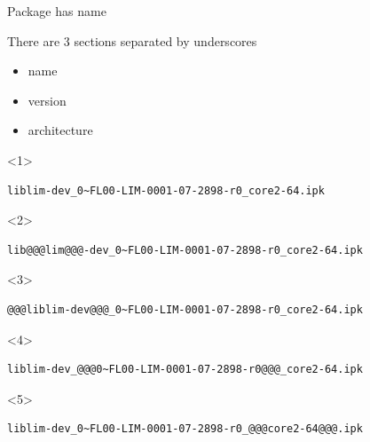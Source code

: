 \documentclass{beamer}
\begin{document}
\begin{frame}[fragile]{Package has name}
    \begin{block}{}
        There are 3 sections separated by underscores
        \begin{itemize}
            \item<2->{name }
            \item<4->{version}
            \item<5->{architecture}
        \end{itemize}
    \end{block}
\begin{onlyenv}<1>\begin{lstlisting}[style=Console]
liblim-dev_0~FL00-LIM-0001-07-2898-r0_core2-64.ipk
\end{lstlisting}\end{onlyenv}
\begin{onlyenv}<2>\begin{lstlisting}[style=Console]
lib@@@lim@@@-dev_0~FL00-LIM-0001-07-2898-r0_core2-64.ipk
\end{lstlisting}\end{onlyenv}
\begin{onlyenv}<3>\begin{lstlisting}[style=Console]
@@@liblim-dev@@@_0~FL00-LIM-0001-07-2898-r0_core2-64.ipk
\end{lstlisting}\end{onlyenv}
\begin{onlyenv}<4>\begin{lstlisting}[style=Console]
liblim-dev_@@@0~FL00-LIM-0001-07-2898-r0@@@_core2-64.ipk
\end{lstlisting}\end{onlyenv}
\begin{onlyenv}<5>\begin{lstlisting}[style=Console]
liblim-dev_0~FL00-LIM-0001-07-2898-r0_@@@core2-64@@@.ipk
\end{lstlisting}\end{onlyenv}
\end{frame}
\end{document}
